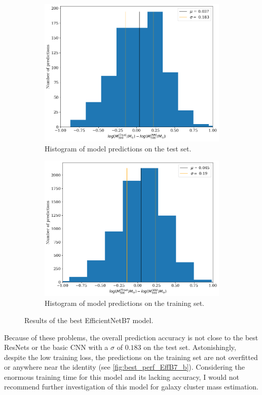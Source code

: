 \begin{figure}[H]
\begin{subfigure}{.46\textwidth}
  \centering
  \includegraphics[width=\linewidth]{images/Chapter4/EffB7/eff_test_hist.png}
  \caption{Histogram of model predictions on the test set.}
  \label{fig:best_perf_EffB7_c}
\end{subfigure}%
\hspace{.6em}
\begin{subfigure}{.46\textwidth}
  \centering
  \includegraphics[width=\linewidth]{images/Chapter4/EffB7/eff_train_hist.png}
  \caption{Histogram of model predictions on the training set.}
  \label{fig:best_perf_EffB7_d}
\end{subfigure}
\caption{Results of the best EfficientNetB7 model.} 
\label{fig:best_perf_EffB7}
\end{figure}

Because of these problems, the overall prediction accuracy is not close to the best ResNets or the basic CNN with a $\sigma$ of $0.183$ on the test set. Astonishingly, despite the low training loss, the predictions on the training set are not overfitted or anywhere near the identity (see \autoref{fig:best_perf_EffB7_b}). Considering the enormous training time for this model and its lacking accuracy, I would not recommend further investigation of this model for galaxy cluster mass estimation.